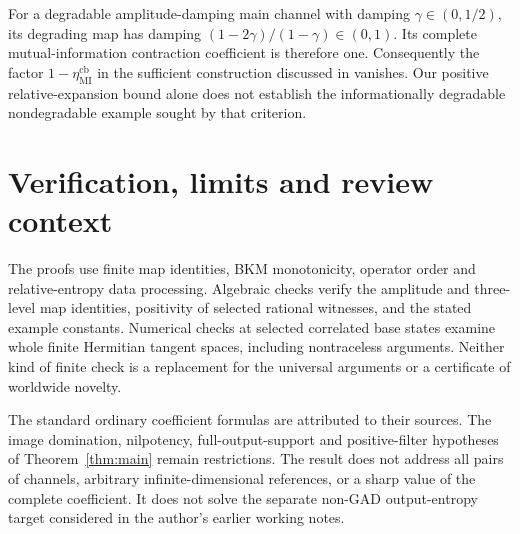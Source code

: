 \documentclass[11pt,a4paper]{article}
\theoremstyle{remark}\newtheorem{remark}[theorem]{Remark}
\begin{document}
For a degradable amplitude-damping main channel with damping
$\gamma\in(0,1/2)$, its degrading map has damping
$(1-2\gamma)/(1-\gamma)\in(0,1)$.
Its complete mutual-information contraction coefficient is therefore one.
Consequently the factor $1-\eta_{\mathrm{MI}}^{\mathrm{cb}}$ in the
sufficient construction discussed in \cite[Section~7]{bgsw} vanishes.
Our positive relative-expansion bound alone does not establish the
informationally degradable nondegradable example sought by that criterion.

\section{Verification, limits and review context}
The proofs use finite map identities, BKM monotonicity, operator order and
relative-entropy data processing. Algebraic checks verify the amplitude
and three-level map identities, positivity of selected rational witnesses,
and the stated example constants. Numerical checks at selected correlated
base states examine whole finite Hermitian tangent spaces, including
nontraceless arguments. Neither kind of finite check is a replacement for
the universal arguments or a certificate of worldwide novelty.

The standard ordinary coefficient formulas are attributed to their sources.
The image domination, nilpotency, full-output-support and positive-filter
hypotheses of Theorem~\ref{thm:main} remain restrictions.
The result does not address all pairs of channels, arbitrary
infinite-dimensional references, or a sharp value of the complete coefficient.
It does not solve the separate non-GAD output-entropy target considered
in the author's earlier working notes.
\end{document}
